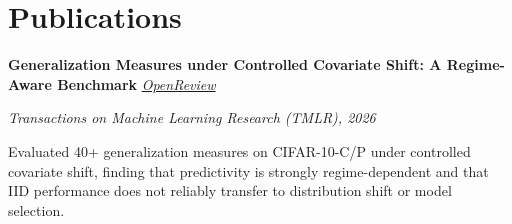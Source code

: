 \section{Publications}

\begin{onecolentry}
    \textbf{Generalization Measures under Controlled Covariate Shift: A Regime-Aware Benchmark}\hfill
    \textit{\href{https://openreview.net/forum?id=X4RoujAYnY}{OpenReview}}
\end{onecolentry}
\vspace{0.10 cm}
\begin{onecolentry}
    \small\textit{Transactions on Machine Learning Research (TMLR), 2026}
\end{onecolentry}
\vspace{0.10 cm}
\begin{onecolentry}
    \begin{highlights}
        \item Evaluated 40+ generalization measures on CIFAR-10-C/P under controlled covariate shift, finding that predictivity is strongly regime-dependent and that IID performance does not reliably transfer to distribution shift or model selection.
    \end{highlights}
\end{onecolentry}
